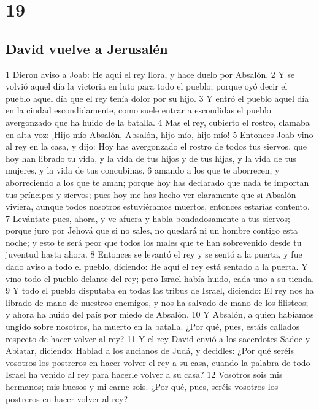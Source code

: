 \chapter{19}

\section*{David vuelve a Jerusalén}


1 Dieron aviso a Joab: He aquí el rey llora, y hace duelo por Absalón.
2 Y se volvió aquel día la victoria en luto para todo el pueblo; porque oyó decir el pueblo aquel día que el rey tenía dolor por su hijo.
3 Y entró el pueblo aquel día en la ciudad escondidamente, como suele entrar a escondidas el pueblo avergonzado que ha huido de la batalla.
4 Mas el rey, cubierto el rostro, clamaba en alta voz: ¡Hijo mío Absalón, Absalón, hijo mío, hijo mío!
5 Entonces Joab vino al rey en la casa, y dijo: Hoy has avergonzado el rostro de todos tus siervos, que hoy han librado tu vida, y la vida de tus hijos y de tus hijas, y la vida de tus mujeres, y la vida de tus concubinas,
6 amando a los que te aborrecen, y aborreciendo a los que te aman; porque hoy has declarado que nada te importan tus príncipes y siervos; pues hoy me has hecho ver claramente que si Absalón viviera, aunque todos nosotros estuviéramos muertos, entonces estarías contento.
7 Levántate pues, ahora, y ve afuera y habla bondadosamente a tus siervos; porque juro por Jehová que si no sales, no quedará ni un hombre contigo esta noche; y esto te será peor que todos los males que te han sobrevenido desde tu juventud hasta ahora.
8 Entonces se levantó el rey y se sentó a la puerta, y fue dado aviso a todo el pueblo, diciendo: He aquí el rey está sentado a la puerta. Y vino todo el pueblo delante del rey; pero Israel había huido, cada uno a su tienda.
9 Y todo el pueblo disputaba en todas las tribus de Israel, diciendo: El rey nos ha librado de mano de nuestros enemigos, y nos ha salvado de mano de los filisteos; y ahora ha huido del país por miedo de Absalón.
10 Y Absalón, a quien habíamos ungido sobre nosotros, ha muerto en la batalla. ¿Por qué, pues, estáis callados respecto de hacer volver al rey? 
11 Y el rey David envió a los sacerdotes Sadoc y Abiatar, diciendo: Hablad a los ancianos de Judá, y decidles: ¿Por qué seréis vosotros los postreros en hacer volver el rey a su casa, cuando la palabra de todo Israel ha venido al rey para hacerle volver a su casa?
12 Vosotros sois mis hermanos; mis huesos y mi carne sois. ¿Por qué, pues, seréis vosotros los postreros en hacer volver al rey?
